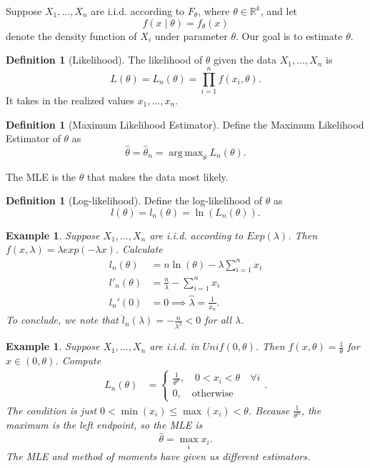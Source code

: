 \documentclass{tufte-handout}
\newcommand*\R{\mathbb{R}}
\DeclareMathOperator*{\argmax}{arg\,max} %
\newtheorem{ex}[thm]{Example}
\theoremstyle{definition}
\newtheorem{defn}[thm]{Definition}
\begin{document}
Suppose $X_1,\ldots,X_n$ are i.i.d. according to $F_{\theta}$, where $\theta \in \R^k$, and let  \[
	f(x\mid \theta) = f_{\theta}(x)
\] denote the density function of $X_i$ under parameter $\theta$. Our goal is to estimate $\theta$.

\begin{defn}[Likelihood]
	The likelihood of $\theta$ given the data $X_1,\ldots,X_n$ is \[
		L(\theta) = L_n(\theta) = \prod_{i=1}^{n} f(x_i,\theta) 
	.\] It takes in the realized values $x_1,\ldots,x_n$.
\end{defn}

\begin{defn}[Maximum Likelihood Estimator]
	Define the Maximum Likelihood Estimator of $\theta$ as \[
		\hat{\theta} = \hat{\theta}_n = \argmax_{\theta} L_n(\theta)
	.\] 
\end{defn}

The MLE is the $\theta$ that makes the data most likely.

\begin{defn}[Log-likelihood]
	Define the log-likelihood of $\theta$ as \[
		l(\theta) = l_n(\theta) = \ln{(L_n(\theta))}
	.\] 
\end{defn}

\begin{ex}
	Suppose $X_1,\ldots,X_n$ are i.i.d. according to $Exp(\lambda)$. Then $f(x,\lambda) = \lambda exp\left( -\lambda x \right)$.
	Calculate 
	\begin{align*}
		l_n(\theta) &= n \ln{(\theta)} - \lambda \sum\limits_{i=1}^{n} x_i \\
		l'_n(\theta) &= \frac{n}{\lambda} - \sum\limits_{i=1}^{n} x_i \\
		l_n'(0) &= 0 \implies \hat{\lambda} = \frac{1}{\overline{x}_n}
	.\end{align*}
	To conclude, we note that $\ddot{l}_n(\lambda) = -\frac{n}{\lambda^2} < 0$ for all $\lambda$.
\end{ex}

\begin{ex}
	Suppose $X_1,\ldots,X_n$ are i.i.d. in $Unif(0,\theta)$. Then $f(x,\theta) = \frac{1}{\theta}$ for $x \in (0,\theta)$. 
	Compute
	\begin{align*}
		L_n(\theta) &= \begin{cases}
			\frac{1}{\theta^n}, \quad 0 < x_i < \theta \quad \forall  i \\
			0, \quad \text{otherwise}
		\end{cases}
	.\end{align*}
	The condition is just $0 < \min(x_i) \le \max(x_i) < \theta$. Because $\frac{1}{\theta^{n}}$, the maximum is the left endpoint, so the MLE is \[
		\hat{\theta} = \max_{i}x_i
	.\] 
	The MLE and method of moments have given us different estimators.
\end{ex}
\end{document}
